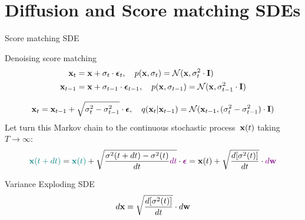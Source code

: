 \section{Diffusion and Score matching SDEs}
\begin{frame}{Score matching SDE}
	\begin{block}{Denoising score matching}
		\vspace{-0.7cm}
		\begin{align*}
			\mathbf{x}_t &= \mathbf{x} + \sigma_t \cdot \boldsymbol{\epsilon}_t, \quad p(\mathbf{x}, \sigma_t) = \mathcal{N}(\mathbf{x}, \sigma_t^2 \cdot \mathbf{I}) \\
			\mathbf{x}_{t-1} &= \mathbf{x} + \sigma_{t-1} \cdot \boldsymbol{\epsilon}_{t-1}, \quad p(\mathbf{x}, \sigma_{t-1}) = \mathcal{N}(\mathbf{x}, \sigma_{t-1}^2 \cdot \mathbf{I})
		\end{align*}
	\end{block}
	\vspace{-1.0cm}
	\[
		\mathbf{x}_t = \mathbf{x}_{t - 1} + \sqrt{\sigma^2_t - \sigma^2_{t-1}} \cdot \boldsymbol{\epsilon}, \quad q(\mathbf{x}_{t} | \mathbf{x}_{t-1}) = \mathcal{N}(\mathbf{x}_{t-1}, (\sigma_t^2 - \sigma_{t-1}^2) \cdot \mathbf{I})
	\]
	Let turn this Markov chain to the continuous stochastic process~$\mathbf{x}(t)$ taking $T \rightarrow \infty$:
	\[
		{\color{teal}\mathbf{x}(t + dt)} = {\color{teal}\mathbf{x}(t)} + \sqrt{\frac{\sigma^2(t + dt) - \sigma^2(t)}{dt} {\color{violet}dt}} \cdot {\color{violet}\boldsymbol{\epsilon}} = \mathbf{x}(t) + \sqrt{\frac{ d [\sigma^2(t)]}{dt}} \cdot {\color{violet}d \mathbf{w}}
	\]
	\vspace{-0.5cm}
	\begin{block}{Variance Exploding SDE}
		\vspace{-0.3cm}
		\[
			d \mathbf{x} = \sqrt{\frac{ d [\sigma^2(t)]}{dt}} \cdot d \mathbf{w}
		\]
	\end{block}
\end{frame}
